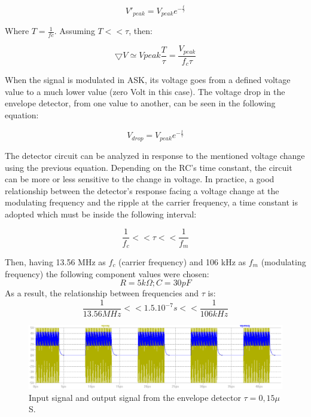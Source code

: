 \documentclass[a4paper, 10pt, conference]{ieeeconf}      %
\begin{document}
\begin{equation} \label{eq:vref}
V'_{peak} = V_{peak}e^{-\frac{t}{\tau}}
\end{equation}

Where $T = \frac{1}{fc}$. Assuming $T << \tau$, then:

\begin{equation} \label{eq:vref}
{\bigtriangledown V} \simeq V{peak}\frac{T}{\tau} = \frac{V_{peak}}{f_c \tau}
\end{equation}


When the signal is modulated in ASK, its voltage goes from a defined voltage value to a much lower value (zero Volt in this case). The voltage drop in the envelope detector, from one value to another, can be seen in the following equation:

\begin{equation} \label{eq:vref}
V_{drop} = V_{peak}e^{-\frac{t}{\tau}}
\end{equation}


The detector circuit can be analyzed in response to the mentioned voltage change  using the previous equation. Depending on the RC’s time constant, the circuit can be more or less sensitive to the change in voltage. In practice, a good relationship between the detector’s response facing a voltage change at the modulating frequency and the ripple at the carrier frequency, a time constant is adopted which must be inside the following interval:

\begin{equation} \label{eq:tauRC}
   \frac{1}{f_c} << \tau << \frac{1}{f_m}
\end{equation}

Then, having 13.56 MHz as $f_c$ (carrier frequency) and 106 kHz as $f_m$ (modulating frequency) the following component values were chosen:
$$R = 5 k\Omega ; C = 30 pF$$
As a result, the relationship between frequencies and $\tau$ is:
$$\frac{1}{13.56MHz}<<1.5.10^{-7}s<<\frac{1}{106kHz}$$

\begin{figure}[H]
\centering
\includegraphics[scale=0.2]{Images/ImagenesTesina/Antecedentes/Sim_Detect.png}
\caption{Input signal and output signal from the envelope detector $\tau = 0,15\mu$ S.}
\label{fig:Sim_detect}
\end{figure}
 
\end{document}
